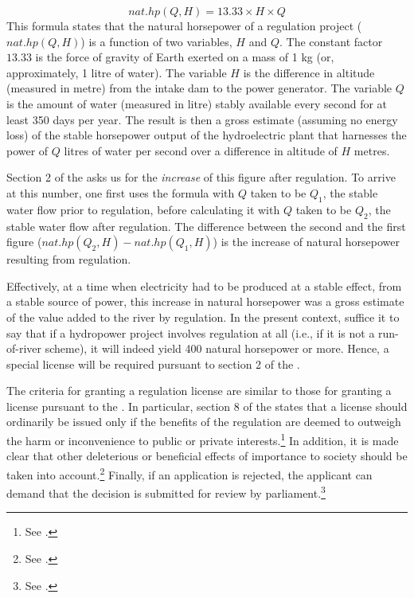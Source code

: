 $$
nat.hp(Q,H) = 13.33 \times H \times Q
$$
This formula states that the natural horsepower of a regulation project ($nat.hp(Q,H)$) is a function of two variables, $H$ and $Q$. The constant factor $13.33$ is the force of gravity of Earth exerted on a mass of 1 kg (or, approximately, 1 litre of water). The variable $H$ is the difference in altitude (measured in metre) from the intake dam to the power generator. The variable $Q$ is the amount of water (measured in litre) stably available every second for at least 350 days per year. The result is then a gross estimate (assuming no energy loss) of the stable horsepower output of the hydroelectric plant that harnesses the power of $Q$ litres of water per second over a difference in altitude of $H$ metres. 

Section 2 of the \cite{wra17} asks us for the {\it increase} of this figure after regulation. To arrive at this number, one first uses the formula with $Q$ taken to be $Q_1$, the stable water flow prior to regulation, before calculating it with $Q$ taken to be $Q_2$, the stable water flow after regulation. The difference between the second and the first figure ($nat.hp(Q_2,H) - nat.hp(Q_1,H)$) is the increase of natural horsepower resulting from regulation.

Effectively, at a time when electricity had to be produced at a stable effect, from a stable source of power, this increase in natural horsepower was a gross estimate of the value added to the river by regulation.
In the present context, suffice it to say that if a hydropower project involves regulation at all (i.e., if it is not a run-of-river scheme), it will indeed yield 400 natural horsepower or more. Hence, a special license will be required pursuant to section 2 of the \cite{wra17}. 


The criteria for granting a regulation license are similar to those for granting a license pursuant to the \cite{wra00}. In particular, section 8 of the \cite{wra17} states that a license should ordinarily be issued only if the benefits of the regulation are deemed to outweigh the harm or inconvenience to public or private interests.\footnote{See \cite[8]{wra17}.} In addition, it is made clear that other deleterious or beneficial effects of importance to society should be taken into account.\footnote{See \cite[8]{wra17}.} Finally, if an application is rejected, the applicant can demand that the decision is submitted for review by parliament.\footnote{See \cite[8]{wra17}.}

